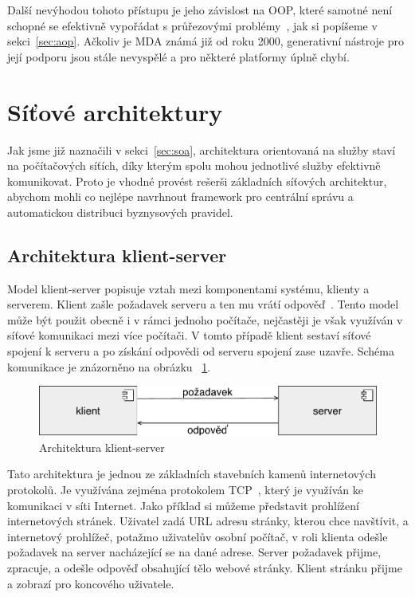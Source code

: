 Další nevýhodou tohoto přístupu je jeho závislost na \gls{OOP},
které samotné není schopné se efektivně vypořádat s průřezovými
problémy~\cite{cemus2014aspect}, jak si popíšeme v sekci~\ref{sec:aop}.
Ačkoliv je \gls{MDA} známá již od roku 2000, generativní nástroje pro
její podporu jsou stále nevyspělé a pro některé platformy úplně chybí.

\section{Síťové architektury}

Jak jsme již naznačili v sekci~\ref{sec:soa}, architektura orientovaná na služby staví
na počítačových síťích, díky kterým spolu mohou jednotlivé služby efektivně komunikovat.
Proto je vhodné provést rešerši základních síťových architektur,
abychom mohli co nejlépe navrhnout framework pro centrální správu
a automatickou distribuci byznysových pravidel.

\subsection{Architektura klient-server}\label{sec:client-server}

Model klient-server popisuje vztah mezi komponentami systému, klienty a serverem.
Klient zašle požadavek serveru a ten mu vrátí odpověď~\cite{berson1992client}.
Tento model může být použit obecně i v rámci jednoho počítače,
nejčastěji je však využíván v síťové komunikaci mezi více počítači.
V tomto případě klient sestaví síťové spojení k serveru a po získání odpovědi
od serveru spojení zase uzavře. Schéma komunikace je znázorněno
na obrázku ~\ref{fig:client-server}.

\begin{figure}[t]
    \centering
    \includegraphics[keepaspectratio=true, width=0.6\linewidth]{figures/client-server.pdf}
    \caption{Architektura klient-server}
    \label{fig:client-server}
\end{figure}

Tato architektura je jednou ze základních stavebních kamenů
internetových protokolů. Je využívána zejména protokolem
\gls{TCP}~\cite{postel1981transmission}, který je využíván ke
komunikaci v síti Internet. Jako příklad si můžeme představit
prohlížení internetových stránek. Uživatel zadá \gls{URL} adresu
stránky, kterou chce navštívit, a internetový prohlížeč, potažmo uživatelův osobní počítač,
v roli klienta odešle požadavek na server nacházející se na dané adrese.
Server požadavek přijme, zpracuje, a odešle odpověď obsahující
tělo webové stránky. Klient stránku přijme a zobrazí pro koncového
uživatele.

